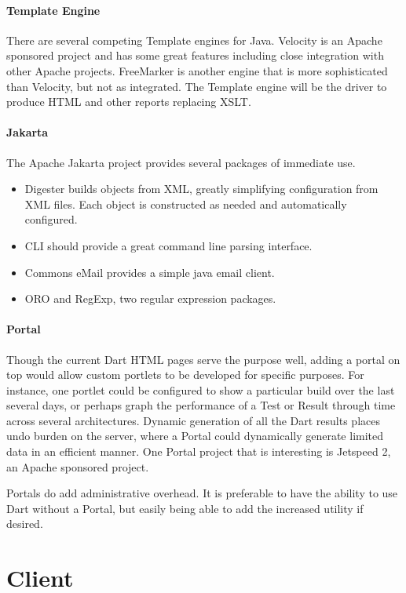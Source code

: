\documentclass{InsightBook}
\begin{document}
\paragraph{Template Engine}
There are several competing Template engines for Java.  Velocity is an
Apache sponsored project and has some great features including close
integration with other Apache projects.  FreeMarker is another engine
that is more sophisticated than Velocity, but not as integrated.  The
Template engine will be the driver to produce HTML and other reports
replacing XSLT.

\paragraph{Jakarta}  The Apache Jakarta project provides several
packages of immediate use.
\begin{itemize}
\item Digester builds objects from XML,
greatly simplifying configuration from XML files.  Each object is
constructed as needed and automatically configured.
\item CLI should provide a great command line parsing interface.
\item Commons eMail provides a simple java email client.
\item ORO and RegExp, two regular expression packages.
\end{itemize}

\paragraph{Portal}  Though the current Dart HTML pages serve the
purpose well, adding a portal on top would allow custom portlets to be
developed for specific purposes.  For instance, one portlet could be
configured to show a particular build over the last several days, or
perhaps graph the performance of a Test or Result through time across
several architectures.  Dynamic generation of all the Dart results
places undo burden on the server, where a Portal could dynamically
generate limited data in an efficient manner.  One Portal project that
is interesting is Jetspeed 2, an Apache sponsored project.

Portals do add administrative overhead.  It is preferable to
have the ability to use Dart without a Portal, but easily being able
to add the increased utility if desired.


\section{Client}
\end{document}
